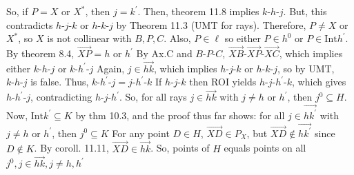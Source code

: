 \documentclass{report}
\begin{document}
\begin{itemize}
                \bigbreak \noindent 
                So, if $P = X$ or $X^{*} $, then $j=k^{\prime}$. Then,  theorem 11.8 implies $ k\text{-}h\text{-}j$. But, this contradicts $ h\text{-}j\text{-}k$ or $ h\text{-}k\text{-}j $ by Theorem 11.3 (UMT for rays). Therefore, $P \ne X$ or $X^{*}$, so $X$ is not collinear with $B,P,C$. Also, $P \in \ell$ so either $P \in h^{0}$ or $P \in \text{Int}h^{\prime}$. By theorem 8.4, $ \overrightarrow{XP} = h$ or $h^{\prime}$
                \bigbreak \noindent 
                By Ax.C and $ B\text{-}P\text{-}C$, $ \overrightarrow{XB}\text{-}\overrightarrow{XP}\text{-}\overrightarrow{XC}$, which implies either $ k\text{-}h\text{-}j$ or $ k\text{-}h^{\prime}\text{-}j$
                \bigbreak \noindent 
                Again, $j \in \overrightarrow{hk}$, which implies $ h\text{-}j\text{-}k$ or $ h\text{-}k\text{-}j$, so by UMT, $ k\text{-}h\text{-}j$ is false. Thus, $ k\text{-}h^{\prime}\text{-}j = j\text{-}h^{\prime}\text{-}k$
                \bigbreak \noindent 
                If $ h\text{-}j\text{-}k$ then ROI yields $ h\text{-}j\text{-}h^{\prime}\text{-}k$, which gives $ h\text{-}h^{\prime}\text{-}j$, contradicting $ h\text{-}j\text{-}h^{\prime}$.
                \bigbreak \noindent 
                So, for all rays $j \in \overrightarrow{hk}$ with $j\ne h$ or $h^{\prime}$, then $ j^{0} \subseteq H$. 
                \bigbreak \noindent 
                Now, $\text{Int}k^{\prime} \subseteq K$ by thm 10.3, and the proof thus far shows: for all $j \in \overrightarrow{hk^{\prime}} $ with $j \ne h$ or $h^{\prime}$, then $j^{0}  \subseteq K$
                \bigbreak \noindent 
                For any point $D \in H$, $ \overrightarrow{XD} \in P_{X}$, but $\overrightarrow{XD}\not\in \overrightarrow{hk^{\prime}} $ since $D \not\in K$. 
                \bigbreak \noindent 
                By coroll. 11.11, $\overrightarrow{XD} \in \overrightarrow{hk}$. So, points of $H$ equals points on all $j^{0}, j\in \overrightarrow{hk}, j\ne h,h^{\prime}$
                \endpf



\end{itemize}
\end{document}
